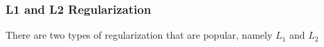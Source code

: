 \subsubsection{L1 and L2 Regularization}

There are two types of regularization that are popular, namely $L_1$ and $L_2$